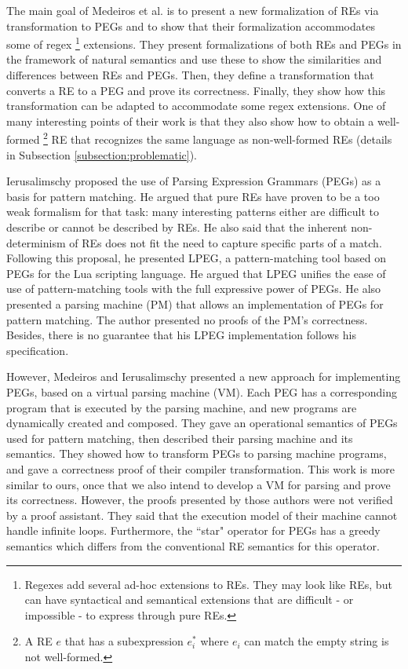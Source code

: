\documentclass[oneside,12pt]{scrbook}
\theoremstyle{definition}
\theoremstyle{plain}
\theoremstyle{definition}
\begin{document}
The main goal of Medeiros et al. \cite{Mascarenhas2011} is to present a new formalization of REs via transformation to PEGs and to show that their formalization accommodates some of regex \footnote{Regexes add several ad-hoc extensions to REs. They may look like REs, but can have syntactical and semantical extensions that are difficult - or impossible - to express through pure REs.} extensions. They present formalizations of both REs and PEGs in the framework of natural semantics and use these to show the similarities and differences between REs and PEGs. Then, they define a transformation that converts a RE to a PEG and prove its correctness. Finally, they show how this transformation can be adapted to accommodate some regex extensions. One of many interesting points of their work is that they also show how to obtain a well-formed \footnote{A RE $e$ that has a subexpression $e^*_i$ where $e_i$ can match the empty string is not well-formed.} RE that recognizes the same language as non-well-formed REs (details in Subsection \ref{subsection:problematic}).
 


Ierusalimschy \cite{Ierusalimschy2009} proposed the use of Parsing Expression Grammars (PEGs) as a basis for pattern matching. He argued that pure REs have proven to be a too weak formalism for that task: many interesting patterns either are difficult to describe or cannot be described by REs. He also said that the inherent non-determinism of REs does not fit the need to capture specific parts of a match. Following this proposal, he presented LPEG, a pattern-matching tool based on PEGs for the Lua scripting language. He argued that LPEG unifies the ease of use of pattern-matching tools with the full expressive power of PEGs. He also presented a parsing machine (PM) that allows an implementation of PEGs for pattern matching. The author presented no proofs of the PM's correctness. Besides, there is no guarantee that his LPEG implementation follows his specification.


However, Medeiros and Ierusalimschy \cite{Medeiros2008} presented a new approach for implementing PEGs, based on a virtual parsing machine (VM). Each PEG has a corresponding program that is executed by the parsing machine, and new programs are dynamically created and composed. They gave an operational semantics of PEGs used for pattern matching, then described their parsing machine and its semantics.
They showed how to transform PEGs to parsing machine programs, and gave a correctness proof of their compiler transformation. This work is more similar to ours, once that we also intend to develop a VM for parsing and prove its correctness. However, the proofs presented by those authors were not verified by a proof assistant. They said that the execution model of their machine cannot handle infinite loops. Furthermore, the ``star" operator for PEGs has a greedy semantics which differs from the conventional RE semantics for this operator.
\end{document}

